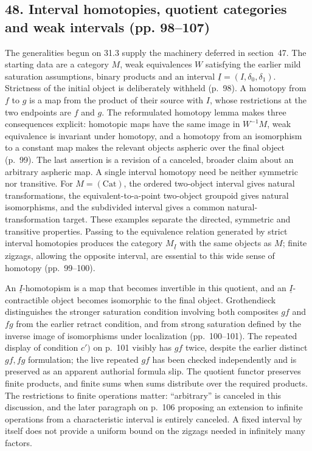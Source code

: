\subsection*{48. Interval homotopies, quotient categories and weak intervals (pp. 98--107)}
The generalities begun on 31.3 supply the machinery deferred in section~47. The starting data are a category $M$, weak equivalences $W$ satisfying the earlier mild saturation assumptions, binary products and an interval $\underline I=(I,\delta_0,\delta_1)$. Strictness of the initial object is deliberately withheld (p.~98). A homotopy from $f$ to $g$ is a map from the product of their source with $I$, whose restrictions at the two endpoints are $f$ and $g$. The reformulated homotopy lemma makes three consequences explicit: homotopic maps have the same image in $W^{-1}M$, weak equivalence is invariant under homotopy, and a homotopy from an isomorphism to a constant map makes the relevant objects aspheric over the final object (p.~99). The last assertion is a revision of a canceled, broader claim about an arbitrary aspheric map. A single interval homotopy need be neither symmetric nor transitive. For $M=(\mathrm{Cat})$, the ordered two-object interval gives natural transformations, the equivalent-to-a-point two-object groupoid gives natural isomorphisms, and the subdivided interval gives a common natural-transformation target. These examples separate the directed, symmetric and transitive properties. Passing to the equivalence relation generated by strict interval homotopies produces the category $M_{\underline I}$ with the same objects as $M$; finite zigzags, allowing the opposite interval, are essential to this wide sense of homotopy (pp.~99--100).

An $\underline I$-homotopism is a map that becomes invertible in this quotient, and an $\underline I$-contractible object becomes isomorphic to the final object. Grothendieck distinguishes the stronger saturation condition involving both composites $gf$ and $fg$ from the earlier retract condition, and from strong saturation defined by the inverse image of isomorphisms under localization (pp.~100--101). The repeated display of condition $c')$ on p.~101 visibly has $gf$ twice, despite the earlier distinct $gf,fg$ formulation; the live repeated $gf$ has been checked independently and is preserved as an apparent authorial formula slip. The quotient functor preserves finite products, and finite sums when sums distribute over the required products. The restrictions to finite operations matter: ``arbitrary'' is canceled in this discussion, and the later paragraph on p.~106 proposing an extension to infinite operations from a characteristic interval is entirely canceled. A fixed interval by itself does not provide a uniform bound on the zigzags needed in infinitely many factors.

